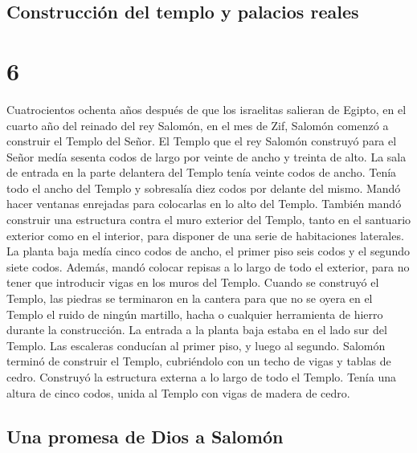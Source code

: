 \hypertarget{construcciuxf3n-del-templo-y-palacios-reales}{%
\subsection{Construcción del templo y palacios
reales}\label{construcciuxf3n-del-templo-y-palacios-reales}}

\hypertarget{section-5}{%
\section{6}\label{section-5}}

 Cuatrocientos ochenta años después de que los israelitas
salieran de Egipto, en el cuarto año del reinado del rey Salomón, en el
mes de Zif, Salomón comenzó a construir el Templo del Señor.
 El Templo que el rey Salomón construyó para el Señor
medía sesenta codos de largo por veinte de ancho y treinta de alto.
 La sala de entrada en la parte delantera del Templo tenía
veinte codos de ancho. Tenía todo el ancho del Templo y sobresalía diez
codos por delante del mismo.  Mandó hacer ventanas
enrejadas para colocarlas en lo alto del Templo.  También
mandó construir una estructura contra el muro exterior del Templo, tanto
en el santuario exterior como en el interior, para disponer de una serie
de habitaciones laterales.  La planta baja medía cinco
codos de ancho, el primer piso seis codos y el segundo siete codos.
Además, mandó colocar repisas a lo largo de todo el exterior, para no
tener que introducir vigas en los muros del Templo. 
Cuando se construyó el Templo, las piedras se terminaron en la cantera
para que no se oyera en el Templo el ruido de ningún martillo, hacha o
cualquier herramienta de hierro durante la construcción. 
La entrada a la planta baja estaba en el lado sur del Templo. Las
escaleras conducían al primer piso, y luego al segundo. 
Salomón terminó de construir el Templo, cubriéndolo con un techo de
vigas y tablas de cedro.  Construyó la estructura externa
a lo largo de todo el Templo. Tenía una altura de cinco codos, unida al
Templo con vigas de madera de cedro.

\hypertarget{una-promesa-de-dios-a-salomuxf3n}{%
\subsection{Una promesa de Dios a
Salomón}\label{una-promesa-de-dios-a-salomuxf3n}}


